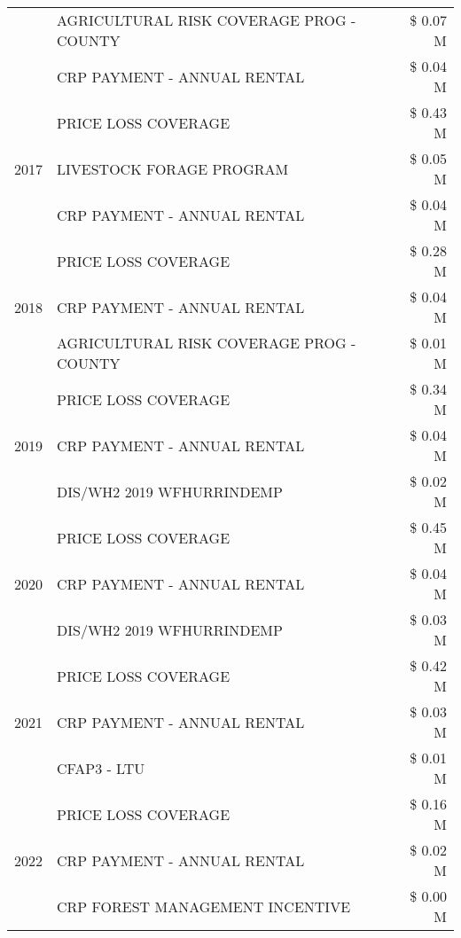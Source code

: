 \begin{tabular}{llr}
 & AGRICULTURAL RISK COVERAGE PROG - COUNTY & \$ 0.07 M \\
 & CRP PAYMENT - ANNUAL RENTAL & \$ 0.04 M \\
\cline{1-3}
\multirow[t]{3}{*}{2017} & PRICE LOSS COVERAGE & \$ 0.43 M \\
 & LIVESTOCK FORAGE PROGRAM & \$ 0.05 M \\
 & CRP PAYMENT - ANNUAL RENTAL & \$ 0.04 M \\
\cline{1-3}
\multirow[t]{3}{*}{2018} & PRICE LOSS COVERAGE & \$ 0.28 M \\
 & CRP PAYMENT - ANNUAL RENTAL & \$ 0.04 M \\
 & AGRICULTURAL RISK COVERAGE PROG - COUNTY & \$ 0.01 M \\
\cline{1-3}
\multirow[t]{3}{*}{2019} & PRICE LOSS COVERAGE & \$ 0.34 M \\
 & CRP PAYMENT - ANNUAL RENTAL & \$ 0.04 M \\
 & DIS/WH2 2019 WFHURRINDEMP & \$ 0.02 M \\
\cline{1-3}
\multirow[t]{3}{*}{2020} & PRICE LOSS COVERAGE & \$ 0.45 M \\
 & CRP PAYMENT - ANNUAL RENTAL & \$ 0.04 M \\
 & DIS/WH2 2019 WFHURRINDEMP & \$ 0.03 M \\
\cline{1-3}
\multirow[t]{3}{*}{2021} & PRICE LOSS COVERAGE & \$ 0.42 M \\
 & CRP PAYMENT - ANNUAL RENTAL & \$ 0.03 M \\
 & CFAP3 - LTU & \$ 0.01 M \\
\cline{1-3}
\multirow[t]{3}{*}{2022} & PRICE LOSS COVERAGE & \$ 0.16 M \\
 & CRP PAYMENT - ANNUAL RENTAL & \$ 0.02 M \\
 & CRP FOREST MANAGEMENT INCENTIVE & \$ 0.00 M \\
\cline{1-3}
\bottomrule
\end{tabular}
